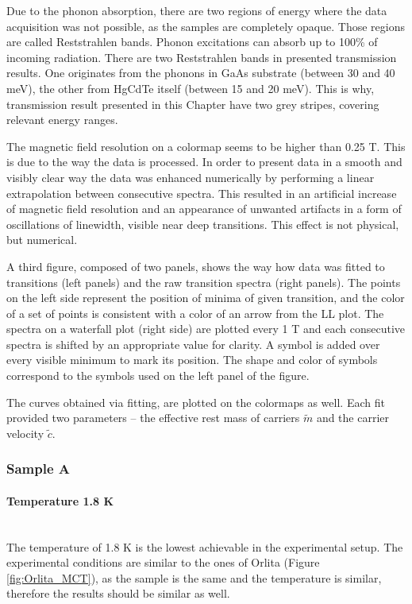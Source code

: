 \documentclass[titlepage,a4paper]{book}
\newcommand{\wciecie}{\quad\phantom{v}}
\newcommand{\myparagraph}[1]{\paragraph{#1}\mbox{}\\}
\begin{document}
Due to the phonon absorption, there are two regions of energy where the data acquisition was not possible, as the samples are completely opaque. Those regions are called Reststrahlen bands. Phonon excitations can absorb up to 100\% of incoming radiation. There are two Reststrahlen bands in presented transmission results. One originates from the phonons in GaAs substrate (between 30 and 40 meV), the other from HgCdTe itself (between 15 and 20 meV). This is why, transmission result presented in this Chapter have two grey stripes, covering relevant energy ranges. 


The magnetic field resolution on a colormap seems to be higher than 0.25 T. This is due to the way the data is processed. In order to present data in a smooth and visibly clear way the data was enhanced numerically by performing a linear extrapolation between consecutive spectra. This resulted in an artificial increase of magnetic field resolution and an appearance of unwanted artifacts in a form of oscillations of linewidth, visible near deep transitions. This effect is not physical, but numerical.  

A third figure, composed of two panels, shows the way how data was fitted to transitions (left panels) and the raw transition spectra (right panels). The points on the left side represent the position of minima of given transition, and the color of a set of points is consistent with a color of an arrow from the LL plot. The spectra on a waterfall plot (right side) are plotted every 1 T and each consecutive spectra is shifted by an appropriate value for clarity. A symbol is added over every visible minimum to mark its position. The shape and color of symbols correspond to the symbols used on the left panel of the figure. 

The curves obtained via fitting, are plotted on the colormaps as well. Each fit provided two parameters -- the effective rest mass of carriers $\tilde{m}$ and the carrier velocity $\tilde{c}$.

\subsubsection{Sample A}
\myparagraph{Temperature 1.8 K}
\wciecie
The temperature of 1.8 K is the lowest achievable in the experimental setup. The experimental conditions are similar to the ones of Orlita \cite{Orlita_MCT} (Figure \ref{fig:Orlita_MCT}), as the sample is the same and the temperature is similar, therefore the results should be similar as well. 
\end{document}

